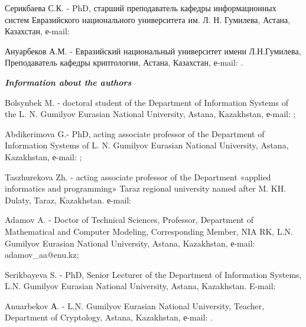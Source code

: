 Серикбаева С.К. - PhD, старший преподаватель кафедры информационных
систем Евразийского национального университета им. Л. Н. Гумилева,
Астана, Казахстан, е-mail:


Ануарбеков А.М. - Евразийский национальный университет имени
Л.Н.Гумилева, Преподаватель кафедры криптологии, Астана, Казахстан,
е-mail:
\href{mailto:almasanuarbekov01@gmail.com}{}.
\href{https://orcid.org/0009-0008-5013-3553}{}

\emph{{\bfseries Information about the authors}}

Bolsynbek M. - doctoral student of the Department of Information Systems
of the L. N. Gumilyov Eurasian National University, Astana, Kazakhstan,
е-mail: \href{mailto:mbolsynbek@bk.ru}{};

Abdikerimova G.- PhD, acting associate professor of the Department of
Information Systems of L. N. Gumilyov Eurasian National University,
Astana, Kazakhstan, е-mail:
\href{mailto:gulzira1981@mail.ru}{};

Taszhurekova Zh. - acting associate professor of the Department «applied
informatics and programming» Taraz regional university named after M.
KH. Dulaty, Taraz, Kazakhstan. е-mail:


Adamov A. - Doctor of Technical Sciences, Professor, Department of
Mathematical and Computer Modeling, Corresponding Member, NIA RK, L.N.
Gumilyov Eurasian National University, Astana, Kazakhstan, е-mail:
adamov\_aa@enu.kz;

Serikbayeva S. - PhD, Senior Lecturer of the Department of Information
Systems, L.N. Gumilyov Eurasian National University, Astana, Kazakhstan.
E-mail:


Anuarbekov А. - L.N. Gumilyov Eurasian National University, Teacher,
Department of Cryptology, Astana, Kazakhstan, е-mail:
\href{mailto:almasanuarbekov01@gmail.com}{}
.\